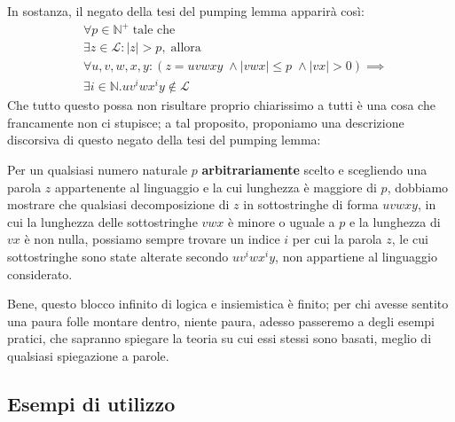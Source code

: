 \documentclass[class=book, crop=false, oneside, 12pt]{standalone}
\begin{document}
  In sostanza, il negato della tesi del pumping lemma apparirà così:
  \begin{align}
		&\forall p \in \mathbb{N}^+ \; \textrm{tale che} \label{eq:pl-neg_1} \\
		&\exists z \in \mathcal{L} : |z| > p,\; \textrm{allora} \label{eq:pl-neg_2} \\
		&\forall u, v, w, x, y : (z = uvwxy\; \land |vwx| \leq p \; \land |vx| > 0) \implies \label{eq:pl-neg_3} \\
		&\exists i \in \mathbb{N}.uv^iwx^iy \not\in \mathcal{L} \label{eq:pl-neg_4}
  \end{align}
  Che tutto questo possa non risultare proprio chiarissimo a tutti è una cosa che francamente non ci stupisce; a tal proposito, proponiamo una descrizione discorsiva di questo negato della tesi del pumping lemma:
  \begin{displayquote}
    Per un qualsiasi numero naturale \(p\) \textbf{arbitrariamente} scelto e scegliendo una parola \(z\) appartenente al linguaggio e la cui lunghezza è maggiore di \(p\), dobbiamo mostrare che qualsiasi decomposizione di \(z\) in sottostringhe di forma \(uvwxy\), in cui la lunghezza delle sottostringhe \(vwx\) è minore o uguale a \(p\) e la lunghezza di \(vx\) è non nulla, possiamo sempre trovare un indice \(i\) per cui la parola \(z\), le cui sottostringhe sono state alterate secondo \(uv^iwx^iy\), non appartiene al linguaggio considerato.
  \end{displayquote}
  Bene, questo blocco infinito di logica e insiemistica è finito; per chi avesse sentito una paura folle montare dentro, niente paura, adesso passeremo a degli esempi pratici, che sapranno spiegare la teoria su cui essi stessi sono basati, meglio di qualsiasi spiegazione a parole.

	\subsection{Esempi di utilizzo}
\end{document}
